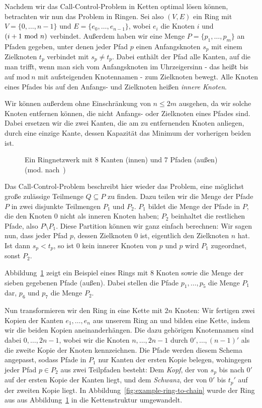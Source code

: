 Nachdem wir das Call-Control-Problem in Ketten optimal lösen können, betrachten wir nun das Problem in Ringen.
Sei also $(V, E)$ ein Ring mit $V=\{0,\dots,n-1\}$ und $E=\{e_0, \dots, e_{n-1}\}$, wobei $e_i$ die
Knoten $i$ und $(i+1 ~\mathrm{mod}~ n)$ verbindet.
Außerdem haben wir eine Menge $P=\{p_1, \dots, p_m\}$ an Pfaden gegeben, unter denen jeder Pfad $p$ einen
Anfangsknoten $s_p$ mit einem Zielknoten $t_p$ verbindet mit $s_p \neq t_p$.
Dabei enthält der Pfad alle Kanten, auf die man trifft, wenn man sich vom Anfangsknoten im Uhrzeigersinn - das heißt
bis auf $\mathrm{mod}~n$ mit aufsteigenden Knotennamen - zum Zielknoten bewegt.
Alle Knoten eines Pfades bis auf den Anfangs- und Zielknoten heißen {\em innere Knoten}.

Wir können außerdem ohne Einschränkung von $n \leq 2m$ ausgehen, da wir solche Knoten entfernen können, die nicht
Anfangs- oder Zielknoten eines Pfades sind.
Dabei ersetzen wir die zwei Kanten, die am zu entfernenden Knoten anliegen, durch eine einzige Kante, dessen
Kapazität das Minimum der vorherigen beiden ist.

\begin{figure}[htbp]
    \centering
    \def\svgwidth{220bp}
    
    \caption{Ein Ringnetzwerk mit 8 Kanten (innen) und 7 Pfaden (außen) (mod. nach~\cite{paper})}
    \label{fig:example-ring}
\end{figure}

Das Call-Control-Problem beschreibt hier wieder das Problem, eine möglichst große zulässige Teilmenge
$Q \subseteq P$ zu finden.
Dazu teilen wir die Menge der Pfade $P$ in zwei disjunkte Teilmengen $P_1$ und $P_2$.
$P_1$ bildet die Menge der Pfade in $P$, die den Knoten $0$ nicht als inneren Knoten haben; $P_2$
beinhaltet die restlichen Pfade, also $P \setminus P_1$.
Diese Partition können wir ganz einfach berechnen:
Wir sagen nun, dass jeder Pfad $p$, dessen Zielknoten $0$ ist, eigentlich den Zielknoten $n$ hat.
Ist dann $s_p < t_p$, so ist $0$ kein innerer Knoten von $p$ und $p$ wird $P_1$ zugeordnet, sonst $P_2$.

Abbildung~\ref{fig:example-ring} zeigt ein Beispiel eines Rings mit 8 Knoten sowie die Menge der sieben gegebenen Pfade (außen).
Dabei stellen die Pfade $p_1,\dots,p_5$ die Menge $P_1$ dar, $p_6$ und $p_7$ die Menge $P_2$.


Nun transformieren wir den Ring in eine Kette mit $2n$ Knoten:
Wir fertigen zwei Kopien der Kanten $e_1,\dotsc,e_n$ aus unserem Ring an und bilden eine Kette, indem wir die
beiden Kopien aneinanderhängen.
Die dazu gehörigen Knotennamen sind dabei $0, \dotsc, 2n-1$, wobei wir die Knoten $n, \dotsc, 2n-1$ durch
$0', \dotsc, (n-1)'$ als die zweite Kopie der Knoten kennzeichnen.
Die Pfade werden diesem Schema angepasst, sodass Pfade in $P_1$ nur Kanten der ersten Kopie belegen, wohingegen
jeder Pfad $p \in P_2$ aus zwei Teilpfaden besteht: Dem {\em Kopf}, der von $s_p$ bis nach $0'$ auf der ersten
Kopie der Kanten liegt, und dem {\em Schwanz}, der von $0'$ bis $t_p '$ auf der zweiten Kopie liegt.
In Abbildung~\ref{fig:example-ring-to-chain} wurde der Ring aus aus Abbildung~\ref{fig:example-ring} in die Kettenstruktur umgewandelt.

